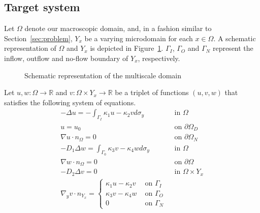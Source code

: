 \documentclass{article}
\newcommand{\R}{\mathbb{ R}}
\begin{document}
\subsection{Target system}
Let $\Omega$ denote our macroscopic domain, and, in a fashion similar to Section~\ref{sec:problem}, $Y_x$ be a varying microdomain for each $x \in \Omega$. A schematic representation of $\Omega$ and $Y_x$ is depicted in Figure~\ref{fig:schema}. $\Gamma_I$, $\Gamma_O$ and $\Gamma_N$ represent the inflow, outflow and no-flow boundary of $Y_x$, respectively.
\begin{figure}[ht!]
    \centering
    \caption{Schematic representation of the multiscale domain}%
    \label{fig:schema}
\end{figure}


Let $u, w : \Omega \to \R$ and $v:\Omega \times Y_x \to \R$ be a triplet of functions $(u,v,w)$ that satisfies the following system of equations.
\begin{align}
    - \Delta u = - \int_{\Gamma_I} \kappa_1 u - \kappa_2 v d\sigma_y &\mbox{ in } \Omega\\
    u = u_0 &\mbox{ on } \partial\Omega_D\\
    \nabla u\cdot n_\Omega = 0 &\mbox{ on } \partial\Omega_N\\[2.5ex]
    -D_1 \Delta w = \int_{\Gamma_0} \kappa_3v - \kappa_4w d\sigma_y &\mbox{ in } \Omega\\
    \nabla w \cdot n_\Omega = 0 &\mbox { on } \partial\Omega\\[2.5ex]
    -D_2 \Delta v = 0 &\mbox{ in } \Omega \times Y_x\\
    \nabla_y v \cdot n_{Y_x} = \begin{cases}
        \kappa_1u - \kappa_2v &\mbox{ on } \Gamma_I\\
        \kappa_3v - \kappa_4w &\mbox{ on } \Gamma_O\\
        0 &\mbox{ on } \Gamma_N
    \end{cases}
\end{align}
\label{sec:future}
\end{document}
